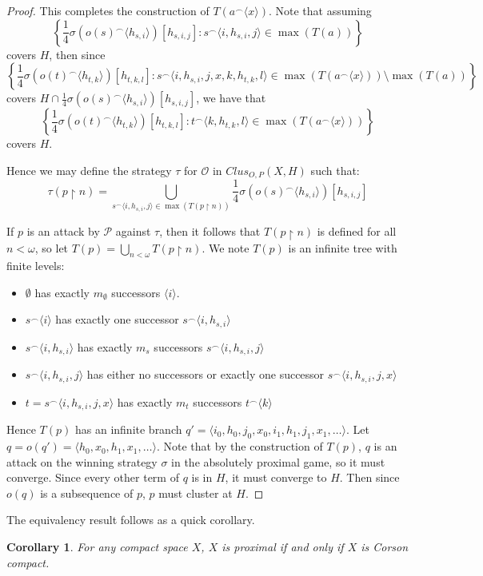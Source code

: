 \documentclass{amsart}
\newtheorem{cor}[thm]{Corollary}
\theoremstyle{definition}
\theoremstyle{remark}
\newcommand{\<}{\langle}
\renewcommand{\>}{\rangle}
\newcommand{\clusgame}[2]{Clus_{O,P}(#1,#2)}
\newcommand{\pl}[1]{\mathscr{#1}}
\newcommand{\rest}{\restriction}
\newcommand{\concat}{^\frown}
\begin{document}
\begin{proof}
 This completes the construction of  $ T(a\concat\<x\>)$. Note that assuming
    \[
      \left\{\frac{1}{4}\sigma(o(s)\concat\<h_{s,i}\>)[h_{s,i,j}] : s\concat\<i,h_{s,i},j\>\in\max(T(a))\right\}
    \]
  covers $H$, then since
    \[
      \left\{\frac{1}{4}\sigma(o(t)\concat\<h_{t,k}\>)[h_{t,k,l}] : s\concat\<i,h_{s,i},j,x,k,h_{t,k},l\>\in\max(T(a\concat\<x\>))\setminus\max(T(a))\right\}
    \]
  covers $H\cap \frac{1}{4}\sigma(o(s)\concat\<h_{s,i}\>)[h_{s,i,j}]$, we have that
    \[
      \left\{\frac{1}{4}\sigma(o(t)\concat\<h_{t,k}\>)[h_{t,k,l}] : t\concat\<k,h_{t,k},l\>\in\max(T(a\concat\<x\>))\right\}
    \]
  covers $H$.

  Hence we may define the strategy $\tau$ for $\pl O$ in $\clusgame{X}{H}$ such that:
  \[
    \tau(p\rest n) = \bigcup_{s\concat\<i,h_{s,i},j\>\in\max(T(p\rest n))} \frac{1}{4}\sigma(o(s)\concat\<h_{s,i}\>)[h_{s,i,j}]
  \]

  If $p$ is an attack by $\pl P$ against $\tau$, then it follows that $T(p\rest n)$ is defined for all $n<\omega$, so let $T(p)=\bigcup_{n<\omega} T(p\rest n)$. We note $T(p)$ is an infinite tree with finite levels:
    \begin{itemize}
      \item $\emptyset$ has exactly $m_\emptyset$ successors $\<i\>$.
      \item $s\concat\<i\>$ has exactly one successor $s\concat\<i,h_{s,i}\>$
      \item $s\concat\<i,h_{s,i}\>$ has exactly $m_s$ successors $s\concat\<i,h_{s,i},j\>$
      \item $s\concat\<i,h_{s,i},j\>$ has either no successors or exactly one successor $s\concat\<i,h_{s,i},j,x\>$
      \item $t=s\concat\<i,h_{s,i},j,x\>$ has exactly $m_t$ successors $t\concat\<k\>$
    \end{itemize}

  Hence $T(p)$ has an infinite branch $q'=\<i_0,h_0,j_0,x_0,i_1,h_1,j_1,x_1,\dots\>$.   Let $q=o(q')=\<h_0,x_0,h_1,x_1,\dots\>$. Note that by the construction of $T(p)$, $q$ is an attack on the winning strategy $\sigma$ in the absolutely proximal game, so it must converge. Since every other term of $q$ is in $H$, it must converge to $H$. Then since $o(q)$ is a subsequence of $p$, $p$ must cluster at $H$.
\end{proof}

The equivalency result follows as a quick corollary.

\begin{cor}
  For any compact space $X$, $X$ is proximal if and only if $X$ is Corson compact.
\end{cor}
\end{document}
